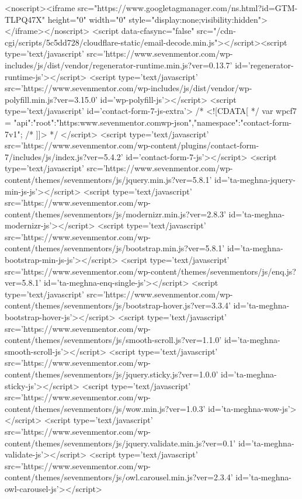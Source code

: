 {<noscript><iframe src="https://www.googletagmanager.com/ns.html?id=GTM-TLPQ47X"
height="0" width="0" style="display:none;visibility:hidden"></iframe></noscript>
<script data-cfasync="false" src="/cdn-cgi/scripts/5c5dd728/cloudflare-static/email-decode.min.js"></script><script type='text/javascript' src='https://www.sevenmentor.com/wp-includes/js/dist/vendor/regenerator-runtime.min.js?ver=0.13.7' id='regenerator-runtime-js'></script>
<script type='text/javascript' src='https://www.sevenmentor.com/wp-includes/js/dist/vendor/wp-polyfill.min.js?ver=3.15.0' id='wp-polyfill-js'></script>
<script type='text/javascript' id='contact-form-7-js-extra'>
/* <![CDATA[ */
var wpcf7 = {"api":{"root":"https:\/\/www.sevenmentor.com\/wp-json\/","namespace":"contact-form-7\/v1"}};
/* ]]> */
</script>
<script type='text/javascript' src='https://www.sevenmentor.com/wp-content/plugins/contact-form-7/includes/js/index.js?ver=5.4.2' id='contact-form-7-js'></script>
<script type='text/javascript' src='https://www.sevenmentor.com/wp-content/themes/sevenmentors/js/jquery.min.js?ver=5.8.1' id='ta-meghna-jquery-min-js-js'></script>
<script type='text/javascript' src='https://www.sevenmentor.com/wp-content/themes/sevenmentors/js/modernizr.min.js?ver=2.8.3' id='ta-meghna-modernizr-js'></script>
<script type='text/javascript' src='https://www.sevenmentor.com/wp-content/themes/sevenmentors/js/bootstrap.min.js?ver=5.8.1' id='ta-meghna-bootstrap-min-js-js'></script>
<script type='text/javascript' src='https://www.sevenmentor.com/wp-content/themes/sevenmentors/js/enq.js?ver=5.8.1' id='ta-meghna-enq-single-js'></script>
<script type='text/javascript' src='https://www.sevenmentor.com/wp-content/themes/sevenmentors/js/bootstrap-hover.js?ver=3.3.4' id='ta-meghna-bootstrap-hover-js'></script>
<script type='text/javascript' src='https://www.sevenmentor.com/wp-content/themes/sevenmentors/js/smooth-scroll.js?ver=1.1.0' id='ta-meghna-smooth-scroll-js'></script>
<script type='text/javascript' src='https://www.sevenmentor.com/wp-content/themes/sevenmentors/js/jquery.sticky.js?ver=1.0.0' id='ta-meghna-sticky-js'></script>
<script type='text/javascript' src='https://www.sevenmentor.com/wp-content/themes/sevenmentors/js/wow.min.js?ver=1.0.3' id='ta-meghna-wow-js'></script>
<script type='text/javascript' src='https://www.sevenmentor.com/wp-content/themes/sevenmentors/js/jquery.validate.min.js?ver=0.1' id='ta-meghna-validate-js'></script>
<script type='text/javascript' src='https://www.sevenmentor.com/wp-content/themes/sevenmentors/js/owl.carousel.min.js?ver=2.3.4' id='ta-meghna-owl-carousel-js'></script>
}
